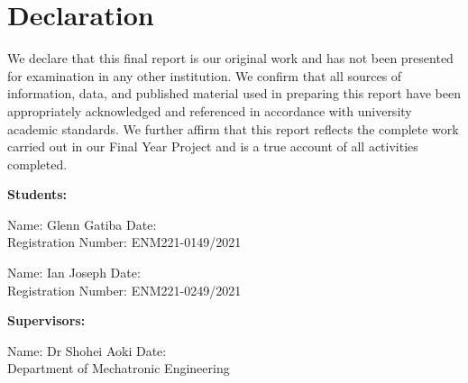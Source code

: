\section*{Declaration}

We declare that this final report is our original work and has not been presented
for examination in any other institution.
We confirm that all sources of information, data, and published material used
in preparing this report have been appropriately acknowledged and referenced in
accordance with university academic standards.
We further affirm that this report reflects the complete work carried out in our
Final Year Project and is a true account of all activities completed.

\vspace{1.5cm}
\noindent\textbf{Students:}

\vspace{1cm}
\noindent Name: Glenn Gatiba \hfill Date: \underline{\hspace{4cm}}\\
Registration Number: ENM221-0149/2021

\vspace{0.8cm}
\noindent Name: Ian Joseph \hfill Date: \underline{\hspace{4cm}}\\
Registration Number: ENM221-0249/2021

\vspace{1.2cm}
\noindent\textbf{Supervisors:}

\vspace{0.8cm}
\noindent Name: Dr Shohei Aoki \hfill Date: \underline{\hspace{4cm}}\\
Department of Mechatronic Engineering
